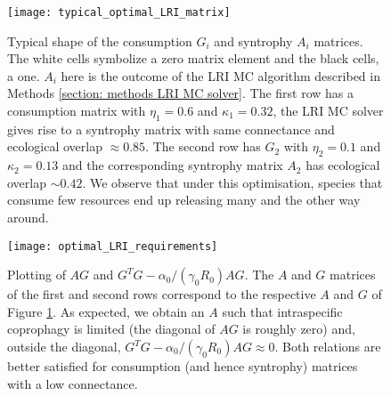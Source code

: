 \documentclass[12pt, titlepage]{report}
\begin{document}
\begin{figure}
\texttt{[image: typical\_optimal\_LRI\_matrix]}
\caption{Typical shape of the consumption $G_i$ and syntrophy $A_i$ matrices. The white cells symbolize a zero matrix element and the black cells, a one. $A_i$ here is the outcome of the LRI MC algorithm described in Methods \ref{section: methods LRI MC solver}. The first row has a consumption matrix with $\eta_1=0.6$ and $\kappa_1=0.32$, the LRI MC solver gives rise to a syntrophy matrix with same connectance and ecological overlap $\approx 0.85$. The second row has $G_2$ with $\eta_2=0.1$ and $\kappa_2=0.13$ and the corresponding syntrophy matrix $A_2$ has ecological overlap $\sim 0.42$. We observe that under this optimisation, species that consume few resources end up releasing many and the other way around.}\label{fig: dynamical stability results typical shape of consumption syntrophy LRI algorithm}
\end{figure}
\begin{figure}
  \begin{minipage}[c]{0.67\textwidth}
    \texttt{[image: optimal\_LRI\_requirements]}
  \end{minipage}\hfill
  \begin{minipage}[c]{0.3\textwidth}
    \caption{Plotting of $AG$ and $G^TG-\alpha_0/(\gamma_0R_0) AG$. The $A$ and $G$ matrices of the first and second rows correspond to the respective $A$ and $G$ of Figure \ref{fig: dynamical stability results typical shape of consumption syntrophy LRI algorithm}. As expected, we obtain an $A$ such that intraspecific coprophagy is limited (the diagonal of $AG$ is roughly zero) and, outside the diagonal, $G^TG-\alpha_0/(\gamma_0R_0) AG \approx 0$. Both relations are better satisfied for consumption (and hence syntrophy) matrices with a low connectance.}\label{fig: dynamical stability optimal LRI requirements met}
  \end{minipage}
\end{figure}
\end{document}
